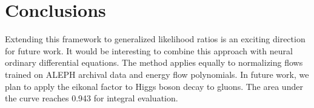 \section{Conclusions}\label{sec:conclusions}

Extending this framework to generalized likelihood ratios is an exciting
direction for future work. It would be interesting to combine this
approach with neural ordinary differential equations. The method applies
equally to normalizing flows trained on ALEPH archival data and energy
flow polynomials. In future work, we plan to apply the eikonal factor to
Higgs boson decay to gluons. The area under the curve reaches 0.943 for
integral evaluation.

